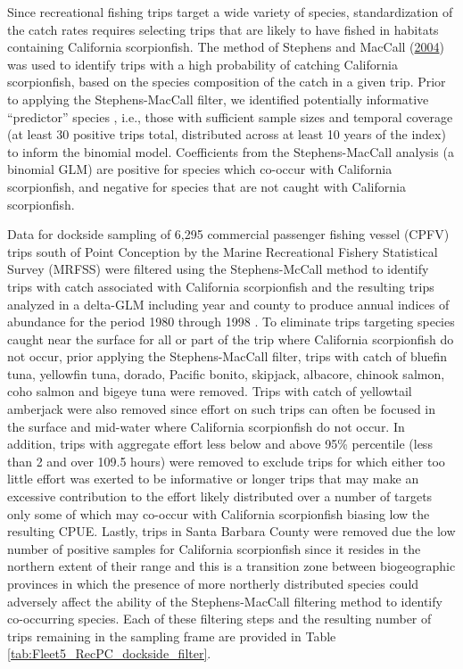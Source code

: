 \documentclass[12pt,]{article}
\begin{document}
Since recreational fishing trips target a wide variety of species,
standardization of the catch rates requires selecting trips that are
likely to have fished in habitats containing California scorpionfish.
The method of Stephens and MacCall
(\protect\hyperlink{ref-Stephens2004}{2004}) was used to identify trips
with a high probability of catching California scorpionfish, based on
the species composition of the catch in a given trip. Prior to applying
the Stephens-MacCall filter, we identified potentially informative
``predictor'' species , i.e., those with sufficient sample sizes and
temporal coverage (at least 30 positive trips total, distributed across
at least 10 years of the index) to inform the binomial model.
Coefficients from the Stephens-MacCall analysis (a binomial GLM) are
positive for species which co-occur with California scorpionfish, and
negative for species that are not caught with California scorpionfish.

Data for dockside sampling of 6,295 commercial passenger fishing vessel
(CPFV) trips south of Point Conception by the Marine Recreational
Fishery Statistical Survey (MRFSS) were filtered using the
Stephens-McCall method to identify trips with catch associated with
California scorpionfish and the resulting trips analyzed in a delta-GLM
including year and county to produce annual indices of abundance for the
period 1980 through 1998 . To eliminate trips targeting species caught
near the surface for all or part of the trip where California
scorpionfish do not occur, prior applying the Stephens-MacCall filter,
trips with catch of bluefin tuna, yellowfin tuna, dorado, Pacific
bonito, skipjack, albacore, chinook salmon, coho salmon and bigeye tuna
were removed. Trips with catch of yellowtail amberjack were also removed
since effort on such trips can often be focused in the surface and
mid-water where California scorpionfish do not occur. In addition, trips
with aggregate effort less below and above 95\% percentile (less than 2
and over 109.5 hours) were removed to exclude trips for which either too
little effort was exerted to be informative or longer trips that may
make an excessive contribution to the effort likely distributed over a
number of targets only some of which may co-occur with California
scorpionfish biasing low the resulting CPUE. Lastly, trips in Santa
Barbara County were removed due the low number of positive samples for
California scorpionfish since it resides in the northern extent of their
range and this is a transition zone between biogeographic provinces in
which the presence of more northerly distributed species could adversely
affect the ability of the Stephens-MacCall filtering method to identify
co-occurring species. Each of these filtering steps and the resulting
number of trips remaining in the sampling frame are provided in Table
\ref{tab:Fleet5_RecPC_dockside_filter}.
\end{document}
